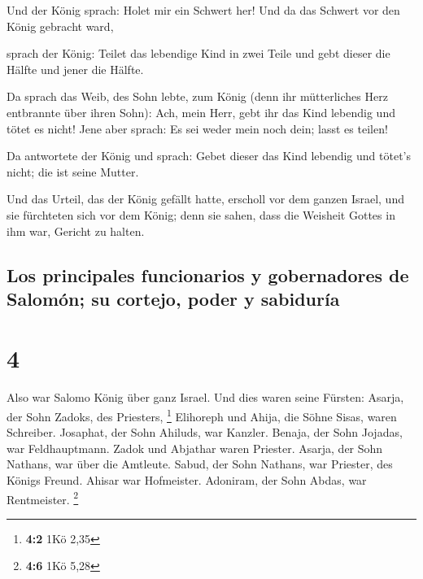  Und der König sprach: Holet mir ein Schwert her! Und da
das Schwert vor den König gebracht ward,

 sprach der König: Teilet das lebendige Kind in zwei
Teile und gebt dieser die Hälfte und jener die Hälfte.

 Da sprach das Weib, des Sohn lebte, zum König (denn ihr
mütterliches Herz entbrannte über ihren Sohn): Ach, mein Herr, gebt ihr
das Kind lebendig und tötet es nicht! Jene aber sprach: Es sei weder
mein noch dein; lasst es teilen!

 Da antwortete der König und sprach: Gebet dieser das
Kind lebendig und tötet's nicht; die ist seine Mutter.

 Und das Urteil, das der König gefällt hatte, erscholl
vor dem ganzen Israel, und sie fürchteten sich vor dem König; denn sie
sahen, dass die Weisheit Gottes in ihm war, Gericht zu halten.

\hypertarget{los-principales-funcionarios-y-gobernadores-de-salomuxf3n-su-cortejo-poder-y-sabiduruxeda}{%
\subsection{Los principales funcionarios y gobernadores de Salomón; su
cortejo, poder y
sabiduría}\label{los-principales-funcionarios-y-gobernadores-de-salomuxf3n-su-cortejo-poder-y-sabiduruxeda}}

\hypertarget{section-3}{%
\section{4}\label{section-3}}

 Also war Salomo König über ganz Israel. 
Und dies waren seine Fürsten: Asarja, der Sohn Zadoks, des Priesters,
\footnote{\textbf{4:2} 1Kö 2,35}  Elihoreph und Ahija, die
Söhne Sisas, waren Schreiber. Josaphat, der Sohn Ahiluds, war Kanzler.
 Benaja, der Sohn Jojadas, war Feldhauptmann. Zadok und
Abjathar waren Priester.  Asarja, der Sohn Nathans, war
über die Amtleute. Sabud, der Sohn Nathans, war Priester, des Königs
Freund.  Ahisar war Hofmeister. Adoniram, der Sohn Abdas,
war Rentmeister. \footnote{\textbf{4:6} 1Kö 5,28}

